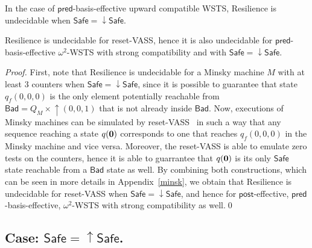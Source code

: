 \documentclass[runningheads]{llncs}
\newcommand{\alain}[1]{\todo[inline,color=red!20]{{\bf AF:} #1}}
\newcommand{\mathieu}[1]{\todo[inline,color=blue!20]{{\bf MH:} #1}}
\newcommand{\pred}{\textsf{pred}}
\newcommand{\post}{\textsf{post}}
\newcommand{\Bad}{\textsf{Bad}}
\newcommand{\Safe}{\textsf{Safe}}
\begin{document}

In the case of $\pred$-basis-effective upward compatible WSTS, {\sc Resilience} is undecidable when $\Safe = \mathop{\downarrow} \Safe$.


\begin{proposition}\label{indec WSTS with dcs}
{\sc Resilience} is undecidable for reset-VASS, hence it is also undecidable for $\pred$-basis-effective $\omega^2$-WSTS with strong compatibility and with 
$\Safe=\mathop{\downarrow} \Safe$.
\end{proposition}


\begin{proof}
First, note that {\sc Resilience} is undecidable for a Minsky machine $M$ with at least $3$ counters when
$\Safe = \mathop{\downarrow} \Safe$,
since it is possible to guarantee that state $q_f(0,0,0)$ is the only element 
potentially reachable from 
$\Bad = Q_{M} \times \mathop{\uparrow} (0,0,1)$ that is not already inside $\Bad$.
Now, executions of Minsky machines can be simulated by reset-VASS~\cite{araki1976PN,dufourd1998reset} in such a way that any sequence 
reaching
 a state 
%
$ q({\bf 0})$ corresponds to one that reaches 
$q_f(0,0,0)$
 in the Minsky machine and vice versa.
 Moreover, the reset-VASS is able to emulate zero tests on the counters, hence it is able to guarrantee that $ q({\bf 0})$ is its only $\Safe$ state reachable from a $\Bad$ state as well.
 By combining both constructions, which can be seen in more details in Appendix~\ref{minsk},
 we obtain that 
 {\sc Resilience} is undecidable for reset-VASS when $\Safe = \downarrow \Safe$, and hence for  $\post$-effective, $\pred$-basis-effective, 
$\omega^2$-WSTS with strong compatibility as well.\qed \end{proof}


\subsection{Case: $\Safe=\mathop{\uparrow} \Safe$.}\label{safe-up}
\end{document}
